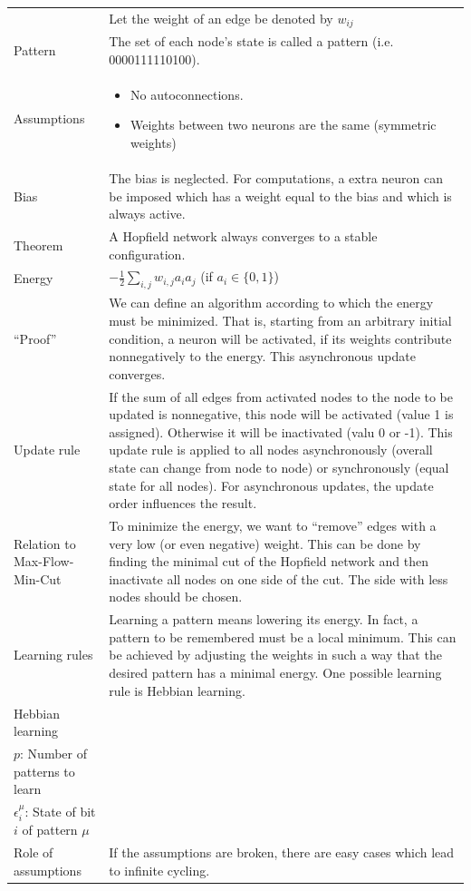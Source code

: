 \begin{longtable}{p{4cm}p{15cm}}
			& Let the weight of an edge be denoted by $w_{ij}$\\
Pattern			& The set of each node's state is called a pattern (i.e. 0000111110100).\\
Assumptions		& \begin{itemize}
           		  	\item No autoconnections.
				\item Weights between two neurons are the same (symmetric weights)
           		  \end{itemize}\\
Bias			& The bias is neglected. For computations, a extra neuron can be imposed which has a weight equal to the bias and which is always active.\\
Theorem			& A Hopfield network always converges to a stable configuration.\\
Energy			& $-\frac{1}{2} \sum_{i,j} w_{i,j} a_i a_j$ (if $a_i \in \{0,1\}$)\\
``Proof''		& We can define an algorithm according to which the energy must be minimized. That is, starting from an arbitrary initial condition, a neuron will be activated, if its weights contribute nonnegatively to the energy. This asynchronous update converges.\\
Update rule		& If the sum of all edges from activated nodes to the node to be updated is nonnegative, this node will be activated (value 1 is assigned). Otherwise it will be inactivated (valu 0 or -1). This update rule is applied to all nodes asynchronously (overall state can change from node to node) or synchronously (equal state for all nodes). For asynchronous updates, the update order influences the result.\\
Relation to Max-Flow-Min-Cut	& To minimize the energy, we want to ``remove'' edges with a very low (or even negative) weight. This can be done by finding the minimal cut of the Hopfield network and then inactivate all nodes on one side of the cut. The side with less nodes should be chosen.\\
Learning rules		& Learning a pattern means lowering its energy. In fact, a pattern to be remembered must be a local minimum. This can be achieved by adjusting the weights in such a way that the desired pattern has a minimal energy. One possible learning rule is Hebbian learning.\\
Hebbian learning	& \begin{tabular}[t]{l}
			    $w_{ij} = \frac{1}{N} \sum_{\mu=1}^p \epsilon_i^{\mu} \epsilon_j^{\mu}$
			    $N$: Number of neurons\\
			    $p$: Number of patterns to learn\\
			    $\epsilon_i^{\mu}$: State of bit $i$ of pattern $\mu$
			  \end{tabular}\\
Role of assumptions	& If the assumptions are broken, there are easy cases which lead to infinite cycling.\\
\end{longtable}
